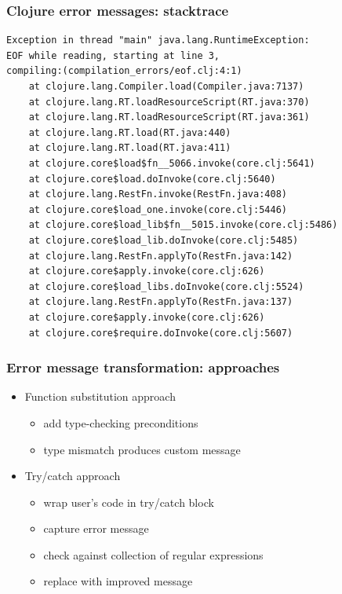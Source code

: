 \documentclass{beamer}
\begin{document}
\begin{frame}[fragile]
\frametitle{Clojure error messages: stacktrace}

\begin{verbatim}
Exception in thread "main" java.lang.RuntimeException:
EOF while reading, starting at line 3,
compiling:(compilation_errors/eof.clj:4:1)
	at clojure.lang.Compiler.load(Compiler.java:7137)
	at clojure.lang.RT.loadResourceScript(RT.java:370)
	at clojure.lang.RT.loadResourceScript(RT.java:361)
	at clojure.lang.RT.load(RT.java:440)
	at clojure.lang.RT.load(RT.java:411)
	at clojure.core$load$fn__5066.invoke(core.clj:5641)
	at clojure.core$load.doInvoke(core.clj:5640)
	at clojure.lang.RestFn.invoke(RestFn.java:408)
	at clojure.core$load_one.invoke(core.clj:5446)
	at clojure.core$load_lib$fn__5015.invoke(core.clj:5486)
	at clojure.core$load_lib.doInvoke(core.clj:5485)
	at clojure.lang.RestFn.applyTo(RestFn.java:142)
	at clojure.core$apply.invoke(core.clj:626)
	at clojure.core$load_libs.doInvoke(core.clj:5524)
	at clojure.lang.RestFn.applyTo(RestFn.java:137)
	at clojure.core$apply.invoke(core.clj:626)
	at clojure.core$require.doInvoke(core.clj:5607)
\end{verbatim}
\end{frame}

\begin{frame}
\frametitle{Error message transformation: approaches}
	\begin{itemize}
	 	\item Function substitution approach
	 		\begin{itemize}
  	 			\item add type-checking preconditions
  	 			\item type mismatch produces custom message
	 		\end{itemize}
	 
		\item Try/catch approach
			\begin{itemize}
  				\item wrap user's code in try/catch block
  				\item capture error message
  				\item check against collection of regular expressions
  				\item replace with improved message
			\end{itemize}
	\end{itemize}
\end{frame}
\end{document}
